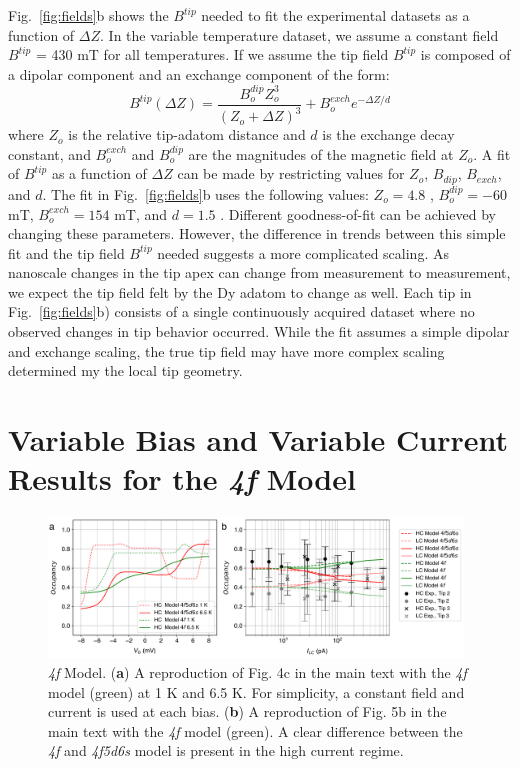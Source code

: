 \documentclass[reprint,amsmath,amssymb,aps,nofootinbib,onecolumn]{revtex4-2}
\begin{document}
Fig.~\ref{fig:fields}b shows the $B^{tip}$ needed to fit the experimental datasets as a function of $\Delta Z$. In the variable temperature dataset, we assume a constant field $B^{tip}$ = 430 mT for all temperatures. If we assume the tip field $B^{tip}$ is composed of a dipolar component and an exchange component of the form:
\begin{equation}
B^{tip}(\Delta Z) =  \frac{B^{dip}_{o} Z^{3}_{o}}{(Z_{o}+\Delta Z)^{3}} + B^{exch}_{o} e^{-\Delta Z/d}
\label{eq:fit}
\end{equation}
where $Z_o$ is the relative tip-adatom distance and $d$ is the exchange decay constant, and $B^{exch}_{o}$ and $B^{dip}_{o}$ are the magnitudes of the magnetic field at $Z_o$. A fit of $B^{tip}$ as a function of $\Delta Z$ can be made by restricting values for $Z_o$, $B_{dip}$, $B_{exch}$, and $d$. The fit in Fig.~\ref{fig:fields}b uses the following values: $Z_o = 4.8$ \text{\normalfont\AA}, $B^{dip}_o = -60$ mT, $B^{exch}_o = 154$ mT, and $d = 1.5$ \text{\normalfont\AA}. Different goodness-of-fit can be achieved by changing these parameters. However, the difference in trends between this simple fit and the tip field $B^{tip}$ needed suggests a more complicated scaling. As nanoscale changes in the tip apex can change from measurement to measurement, we expect the tip field felt by the Dy adatom to change as well. Each tip in Fig.~\ref{fig:fields}b) consists of a single continuously acquired dataset where no observed changes in tip behavior occurred. While the fit assumes a simple dipolar and exchange scaling, the true tip field may have more complex scaling determined my the local tip geometry.

\section{Variable Bias and Variable Current Results for the \textit{4f} Model}
\begin{figure}[h!]
\includegraphics[width=0.98\textwidth]{model_4f.pdf}
\caption{\textit{4f} Model. (\textbf{a}) A reproduction of Fig. 4c in the main text with the \textit{4f} model (green) at 1 K and 6.5 K. For simplicity, a constant field and current is used at each bias. (\textbf{b}) A reproduction of Fig. 5b in the main text with the \textit{4f} model (green). A clear difference between the \textit{4f} and \textit{4f5d6s} model is present in the high current regime.
\label{fig:bias_curr} }
\end{figure}
\end{document}
